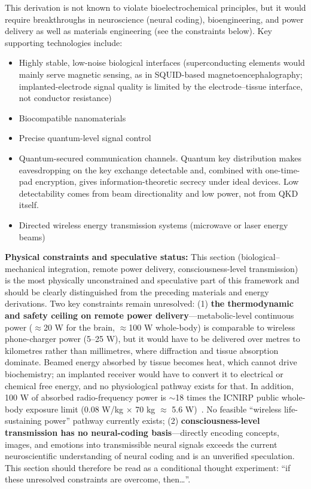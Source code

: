 \documentclass[aps,prd,twocolumn,superscriptaddress,nofootinbib]{revtex4-2}
\begin{document}
This derivation is not known to violate bioelectrochemical principles, but it would require breakthroughs in neuroscience (neural coding), bioengineering, and power delivery as well as materials engineering (see the constraints below). Key supporting technologies include:

\begin{itemize}
  \item Highly stable, low-noise biological interfaces (superconducting elements would mainly serve magnetic sensing, as in SQUID-based magnetoencephalography; implanted-electrode signal quality is limited by the electrode--tissue interface, not conductor resistance)
  \item Biocompatible nanomaterials
  \item Precise quantum-level signal control
  \item Quantum-secured communication channels. Quantum key distribution makes eavesdropping on the key exchange detectable and, combined with one-time-pad encryption, gives information-theoretic secrecy under ideal devices. Low detectability comes from beam directionality and low power, not from QKD itself.
  \item Directed wireless energy transmission systems (microwave or laser energy beams)
\end{itemize}

\textbf{Physical constraints and speculative status:} This section (biological--mechanical integration, remote power delivery, consciousness-level transmission) is the most physically unconstrained and speculative part of this framework and should be clearly distinguished from the preceding materials and energy derivations. Two key constraints remain unresolved: (1) \textbf{the thermodynamic and safety ceiling on remote power delivery}---metabolic-level continuous power ($\approx$20 W for the brain, $\approx$100 W whole-body) is comparable to wireless phone-charger power (5--25 W), but it would have to be delivered over metres to kilometres rather than millimetres, where diffraction and tissue absorption dominate. Beamed energy absorbed by tissue becomes heat, which cannot drive biochemistry; an implanted receiver would have to convert it to electrical or chemical free energy, and no physiological pathway exists for that. In addition, 100 W of absorbed radio-frequency power is ${\sim}$18 times the ICNIRP public whole-body exposure limit (0.08 W/kg $\times$ 70 kg $\approx$ 5.6 W)~\cite{ICNIRP2020}. No feasible ``wireless life-sustaining power'' pathway currently exists; (2) \textbf{consciousness-level transmission has no neural-coding basis}---directly encoding concepts, images, and emotions into transmissible neural signals exceeds the current neuroscientific understanding of neural coding and is an unverified speculation. This section should therefore be read as a conditional thought experiment: ``if these unresolved constraints are overcome, then\ldots{}''.
\end{document}
